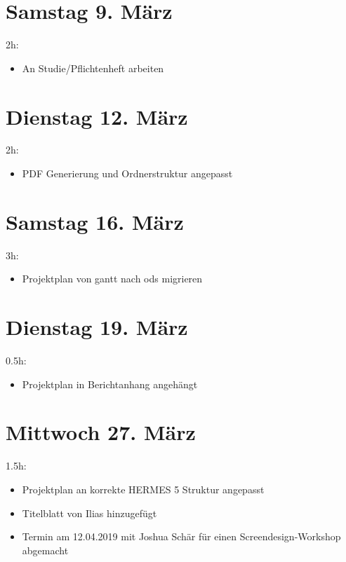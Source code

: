 \section{Samstag 9. März}\label{samstag-9.muxe4rz}

2h:

\begin{itemize}
  \tightlist
  \item
        An Studie/Pflichtenheft arbeiten
\end{itemize}

\section{Dienstag 12. März}\label{dienstag-12.muxe4rz}

2h:

\begin{itemize}
  \tightlist
  \item
        PDF Generierung und Ordnerstruktur angepasst
\end{itemize}

\section{Samstag 16. März}\label{samstag-16.muxe4rz}

3h:

\begin{itemize}
  \tightlist
  \item
        Projektplan von gantt nach ods migrieren
\end{itemize}

\section{Dienstag 19. März}\label{dienstag-19.muxe4rz}

0.5h:

\begin{itemize}
  \tightlist
  \item
        Projektplan in Berichtanhang angehängt
\end{itemize}

\section{Mittwoch 27. März}\label{mittwoch-27.muxe4rz}

1.5h:

\begin{itemize}
  \tightlist
  \item
        Projektplan an korrekte HERMES 5 Struktur angepasst
  \item
        Titelblatt von Ilias hinzugefügt
  \item
        Termin am 12.04.2019 mit Joshua Schär für einen Screendesign-Workshop abgemacht
\end{itemize}

